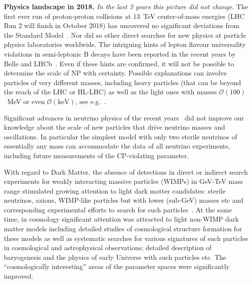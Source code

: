 {\bf Physics landscape in 2018.} \emph{In the last 3 years this picture did not change}.   The first ever run of proton-proton collisions at 13~TeV center-of-mass energies (LHC Run 2 will finish in October 2018) has uncovered no significant deviations from the Standard Model~\cite{ICHEP2018_ATLAS,ICHEP2018_CMS,CMSSUSY,ATLASSUSY,ATLASexotics,CMSexotics,ICHEP2018_exotics,ICHEP2018_SUSY}. Nor did so other direct searches for new physics at particle physics laboratories worldwide. The intriguing hints of lepton flavour universality violations in semi-leptonic B decays have been reported in the recent years by Belle and LHCb~\cite{Huschle:2015rga,Sato:2016svk,Hirose:2016wfn,Aaij:2015yra,Aaij:2017uff}. Even if these hints are confirmed, it will not be possible to determine the scale of NP with certainty. Possible explanations can involve particles of very different masses, including heavy particles (that can be beyond the reach of the LHC or HL-LHC) as well as the light ones with masses $\mathcal{O}(100)$~MeV or even $\mathcal{O}(\mathrm{keV})$, see e.g.~\cite{He:2017bft,He:2012zp,Robinson:2018gza,Azatov:2018kzb}.

Significant advances in neutrino physics of the recent years~\cite{ICHEP2018_neutrino,ICHEP2018_neutrino_theory} did not improve our knowledge about the scale of new particles that drive neutrino masses and oscillations. In particular the simplest model with only two sterile neutrinos of essentially any mass can accommodate the data of all neutrino experiments, including future measurements of the CP-violating parameter.

With regard to Dark Matter, the absence of detections in direct or indirect search experiments for weakly interacting massive particles (WIMPs) in GeV-TeV mass range stimulated growing attention to light dark matter candidates: sterile neutrinos, axions, WIMP-like particles but with lower (sub-GeV) masses etc and corresponding experimental efforts to search for such particles~\cite{ICHEP2018_DM,Duffy:2009ig,Boyarsky:2018tvu}. At the same time, in cosmology significant attention was attracted to light non-WIMP dark matter models including detailed studies of cosmological structure formation for these models as well as systematic searches for various signatures of such particles in cosmological and astrophysical observations; detailed description of baryogenesis and the physics of early Universe with such particles etc. The ``cosmologically interesting'' areas of the parameter spaces were significantly improved.

\bigskip

